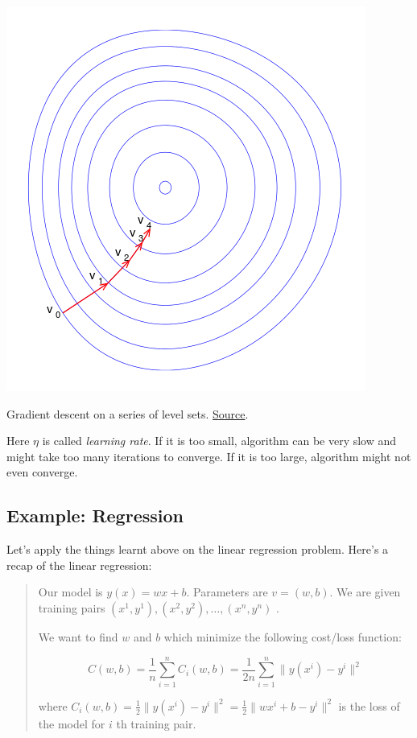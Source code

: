 \documentclass[a4paper]{tufte-handout}
\begin{document}
\begin{marginfigure}
  \includegraphics[width=\linewidth]{Gradient_descent}
  \caption{Gradient descent on a series of level sets.
  \href{https://en.wikipedia.org/wiki/Gradient_descent}{Source}.}
\end{marginfigure}

Here \(\eta\) is called \emph{learning rate}. If it is too small,
algorithm can be very slow and might take too many iterations to
converge. If it is too large, algorithm might not even converge.

\subsection{Example: Regression}\label{example-regression}

Let's apply the things learnt above on the linear regression problem. Here's
a recap of the linear regression:

\begin{quote}
Our model is \(y(x) = wx + b\). Parameters are \(v = (w, b)\). We are
given training pairs \((x^1, y^1), (x^2, y^2), \ldots, (x^n, y^n)\)
.

We want to find \(w\) and \(b\) which minimize the following cost/loss
function:

\[ C(w, b) = \frac{1}{n} \sum_{i = 1}^{n} C_i(w, b) = \frac{1}{2n} \sum_{i = 1}^{n} \| y(x^i) - y^i\|^2 \]

where
\(C_i(w, b) = \frac{1}{2} \| y(x^i) - y^i\|^2 = \frac{1}{2} \| wx^i + b - y^i\|^2\)
is the loss of the model for \(i\) th training pair.
\end{quote}
\end{document}
